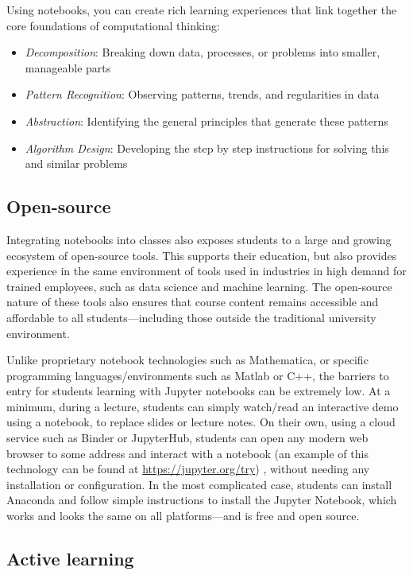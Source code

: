 \documentclass[]{book}
\providecommand{\tightlist}{%
  \setlength{\itemsep}{0pt}\setlength{\parskip}{0pt}}
\begin{document}
Using notebooks, you can create rich learning experiences that link
together the core foundations of computational thinking:

\begin{itemize}
\tightlist
\item
  \emph{Decomposition}: Breaking down data, processes, or problems into
  smaller, manageable parts
\item
  \emph{Pattern Recognition}: Observing patterns, trends, and
  regularities in data
\item
  \emph{Abstraction}: Identifying the general principles that generate
  these patterns
\item
  \emph{Algorithm Design}: Developing the step by step instructions for
  solving this and similar problems
\end{itemize}

\subsection{Open-source}\label{open-source}

Integrating notebooks into classes also exposes students to a large and
growing ecosystem of open-source tools. This supports their education,
but also provides experience in the same environment of tools used in
industries in high demand for trained employees, such as data science
and machine learning. The open-source nature of these tools also ensures
that course content remains accessible and affordable to all
students---including those outside the traditional university
environment.

Unlike proprietary notebook technologies such as Mathematica, or
specific programming languages/environments such as Matlab or C++, the
barriers to entry for students learning with Jupyter notebooks can be
extremely low. At a minimum, during a lecture, students can simply
watch/read an interactive demo using a notebook, to replace slides or
lecture notes. On their own, using a cloud service such as Binder or
JupyterHub, students can open any modern web browser to some address and
interact with a notebook (an example of this technology can be found at
\url{https://jupyter.org/try}) , without needing any installation or
configuration. In the most complicated case, students can install
Anaconda and follow simple instructions to install the Jupyter Notebook,
which works and looks the same on all platforms---and is free and open
source.

\subsection{Active learning}\label{active-learning}
\end{document}
